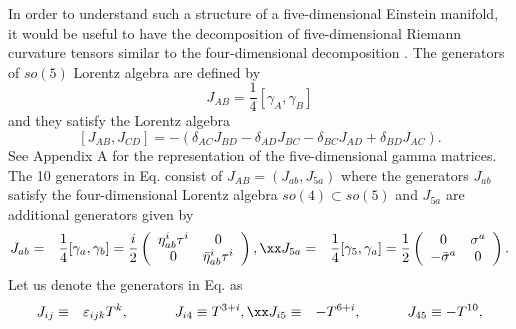 \documentclass[12pt,epsf]{article}
\begin{document}
In order to understand such a structure of a five-dimensional Einstein manifold, it would be useful
to have the decomposition of five-dimensional Riemann curvature tensors
similar to the four-dimensional decomposition .
The generators of $so(5)$ Lorentz algebra are defined by
\begin{equation}\label{t5-gen}
  J_{AB} = \frac{1}{4} [\gamma_A, \gamma_B]
\end{equation}
and they satisfy the Lorentz algebra
\begin{equation}\label{t5-dirac}
  [J_{AB}, J_{CD}] = - ( \delta_{AC} J_{BD} - \delta_{AD} J_{BC} - \delta_{BC} J_{AD} + \delta_{BD} J_{AC}).
\end{equation}
See Appendix A for the representation of the five-dimensional gamma matrices.
The 10 generators in Eq.  consist of $J_{AB}=(J_{ab}, J_{5a})$ where
the generators $J_{ab}$ satisfy the four-dimensional Lorentz algebra $so(4) \subset so(5)$ and
$J_{5a}$ are additional generators given by
\begin{eqnarray} \label{tso5-dec}
 J_{ab}  &=&  \frac{1}{4} [\gamma_a, \gamma_b] = \frac{i}{2} \left(
                                                               \begin{array}{cc}
                                                                 \eta^i_{ab} \tau^i  & 0 \\
                                                                 0 & \bar{\eta}^i_{ab} \tau^i \\
                                                               \end{array}
                                                             \right), \xx
 J_{5a}  &=&  \frac{1}{4} [\gamma_5, \gamma_a] = \frac{1}{2} \left(
                                                               \begin{array}{cc}
                                                                 0  &  \sigma^a \\
                                                                 - \bar{\sigma}^a & 0 \\
                                                               \end{array}
                                                             \right).
\end{eqnarray}
Let us denote the generators in Eq.  as
\begin{eqnarray} \label{tab-45}
  J_{ij} &\equiv& \varepsilon_{ijk} T^k, \qquad \quad \; J_{i4} \equiv T^{3+i},  \xx
  J_{i5} &\equiv& - T^{6+i}, \qquad \quad \; J_{45} \equiv -  T^{10},
\end{eqnarray}
\end{document}
